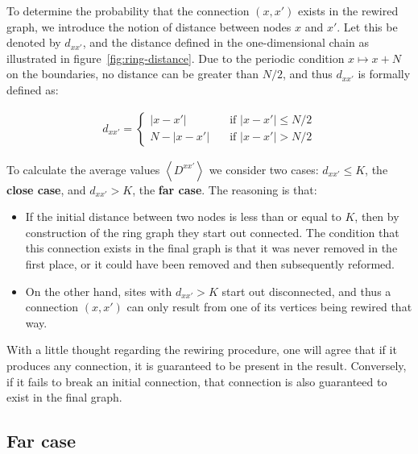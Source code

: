 To determine the probability that the connection $(x, x')$ exists in the rewired graph, we introduce the notion of distance between
nodes $x$ and $x'$. Let this be denoted by $d_{xx'}$, and the distance defined in the one-dimensional chain as illustrated in
figure~\ref{fig:ring-distance}. Due to the periodic condition $x \mapsto x+N$ on the boundaries, no distance can be greater than $N/2$,
and thus $d_{xx'}$ is formally defined as:

\begin{align}
  d_{xx'} =
  \begin{cases}
    |x-x'| \quad &\text{if $|x-x'|\leq N/2$} \\
    N-|x-x'| \quad &\text{if $|x-x'| > N/2$}
  \end{cases}
  \label{dist}
\end{align}

To calculate the average values $\left< D^{xx'} \right>$ we consider two cases: $d_{xx'} \leq K$, the \textbf{close case}, and $d_{xx'}
> K$, the \textbf{far case}. The reasoning is that:

\begin{itemize}
  \item If the initial distance between two nodes is less than or equal to $K$, then by construction of the ring graph they start out
    connected. The condition that this connection exists in the final graph is that it was never removed in the first place, or it
    could have been removed and then subsequently reformed.

  \item On the other hand, sites with $d_{xx'}>K$ start out disconnected, and thus a connection $(x,x')$ can only result from one of
    its vertices being rewired that way.
\end{itemize}

With a little thought regarding the rewiring procedure, one will agree that if it produces any connection, it is guaranteed to be
present in the result. Conversely, if it fails to break an initial connection, that connection is also guaranteed to exist in the final
graph.

\subsection*{Far case}


